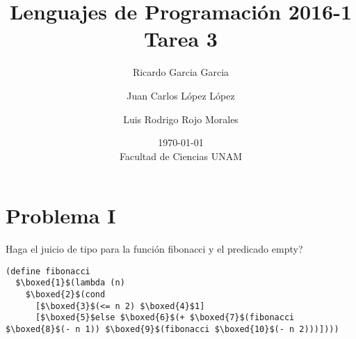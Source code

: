 \documentclass{article}
\title{Lenguajes de Programación 2016-1\\Tarea 3}
\author{Ricardo Garcia Garcia \and  Juan Carlos López López \and Luis Rodrigo Rojo Morales}
\date{\today\\ Facultad de Ciencias UNAM}
\begin{document}
\maketitle
\section*{Problema I}
Haga el juicio de tipo para la función fibonacci y el predicado empty?\\

\begin{lstlisting}
(define fibonacci
  $\boxed{1}$(lambda (n)
    $\boxed{2}$(cond
      [$\boxed{3}$(<= n 2) $\boxed{4}$1]
      [$\boxed{5}$else $\boxed{6}$(+ $\boxed{7}$(fibonacci $\boxed{8}$(- n 1)) $\boxed{9}$(fibonacci $\boxed{10}$(- n 2)))])))
\end{lstlisting}
\end{document}
